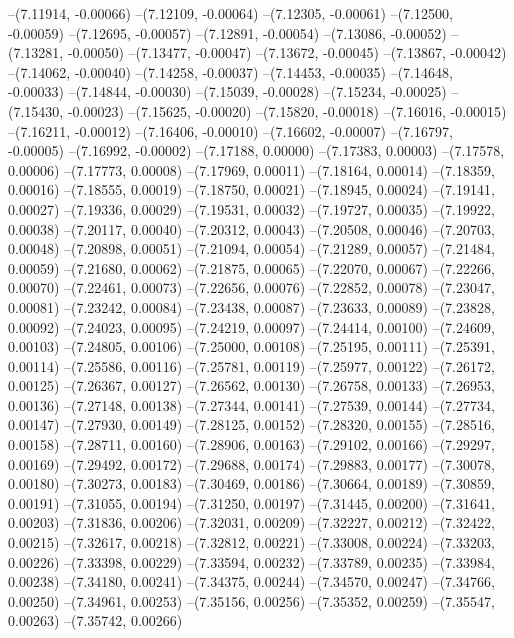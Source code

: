--(7.11914, -0.00066)
--(7.12109, -0.00064)
--(7.12305, -0.00061)
--(7.12500, -0.00059)
--(7.12695, -0.00057)
--(7.12891, -0.00054)
--(7.13086, -0.00052)
--(7.13281, -0.00050)
--(7.13477, -0.00047)
--(7.13672, -0.00045)
--(7.13867, -0.00042)
--(7.14062, -0.00040)
--(7.14258, -0.00037)
--(7.14453, -0.00035)
--(7.14648, -0.00033)
--(7.14844, -0.00030)
--(7.15039, -0.00028)
--(7.15234, -0.00025)
--(7.15430, -0.00023)
--(7.15625, -0.00020)
--(7.15820, -0.00018)
--(7.16016, -0.00015)
--(7.16211, -0.00012)
--(7.16406, -0.00010)
--(7.16602, -0.00007)
--(7.16797, -0.00005)
--(7.16992, -0.00002)
--(7.17188, 0.00000)
--(7.17383, 0.00003)
--(7.17578, 0.00006)
--(7.17773, 0.00008)
--(7.17969, 0.00011)
--(7.18164, 0.00014)
--(7.18359, 0.00016)
--(7.18555, 0.00019)
--(7.18750, 0.00021)
--(7.18945, 0.00024)
--(7.19141, 0.00027)
--(7.19336, 0.00029)
--(7.19531, 0.00032)
--(7.19727, 0.00035)
--(7.19922, 0.00038)
--(7.20117, 0.00040)
--(7.20312, 0.00043)
--(7.20508, 0.00046)
--(7.20703, 0.00048)
--(7.20898, 0.00051)
--(7.21094, 0.00054)
--(7.21289, 0.00057)
--(7.21484, 0.00059)
--(7.21680, 0.00062)
--(7.21875, 0.00065)
--(7.22070, 0.00067)
--(7.22266, 0.00070)
--(7.22461, 0.00073)
--(7.22656, 0.00076)
--(7.22852, 0.00078)
--(7.23047, 0.00081)
--(7.23242, 0.00084)
--(7.23438, 0.00087)
--(7.23633, 0.00089)
--(7.23828, 0.00092)
--(7.24023, 0.00095)
--(7.24219, 0.00097)
--(7.24414, 0.00100)
--(7.24609, 0.00103)
--(7.24805, 0.00106)
--(7.25000, 0.00108)
--(7.25195, 0.00111)
--(7.25391, 0.00114)
--(7.25586, 0.00116)
--(7.25781, 0.00119)
--(7.25977, 0.00122)
--(7.26172, 0.00125)
--(7.26367, 0.00127)
--(7.26562, 0.00130)
--(7.26758, 0.00133)
--(7.26953, 0.00136)
--(7.27148, 0.00138)
--(7.27344, 0.00141)
--(7.27539, 0.00144)
--(7.27734, 0.00147)
--(7.27930, 0.00149)
--(7.28125, 0.00152)
--(7.28320, 0.00155)
--(7.28516, 0.00158)
--(7.28711, 0.00160)
--(7.28906, 0.00163)
--(7.29102, 0.00166)
--(7.29297, 0.00169)
--(7.29492, 0.00172)
--(7.29688, 0.00174)
--(7.29883, 0.00177)
--(7.30078, 0.00180)
--(7.30273, 0.00183)
--(7.30469, 0.00186)
--(7.30664, 0.00189)
--(7.30859, 0.00191)
--(7.31055, 0.00194)
--(7.31250, 0.00197)
--(7.31445, 0.00200)
--(7.31641, 0.00203)
--(7.31836, 0.00206)
--(7.32031, 0.00209)
--(7.32227, 0.00212)
--(7.32422, 0.00215)
--(7.32617, 0.00218)
--(7.32812, 0.00221)
--(7.33008, 0.00224)
--(7.33203, 0.00226)
--(7.33398, 0.00229)
--(7.33594, 0.00232)
--(7.33789, 0.00235)
--(7.33984, 0.00238)
--(7.34180, 0.00241)
--(7.34375, 0.00244)
--(7.34570, 0.00247)
--(7.34766, 0.00250)
--(7.34961, 0.00253)
--(7.35156, 0.00256)
--(7.35352, 0.00259)
--(7.35547, 0.00263)
--(7.35742, 0.00266)
